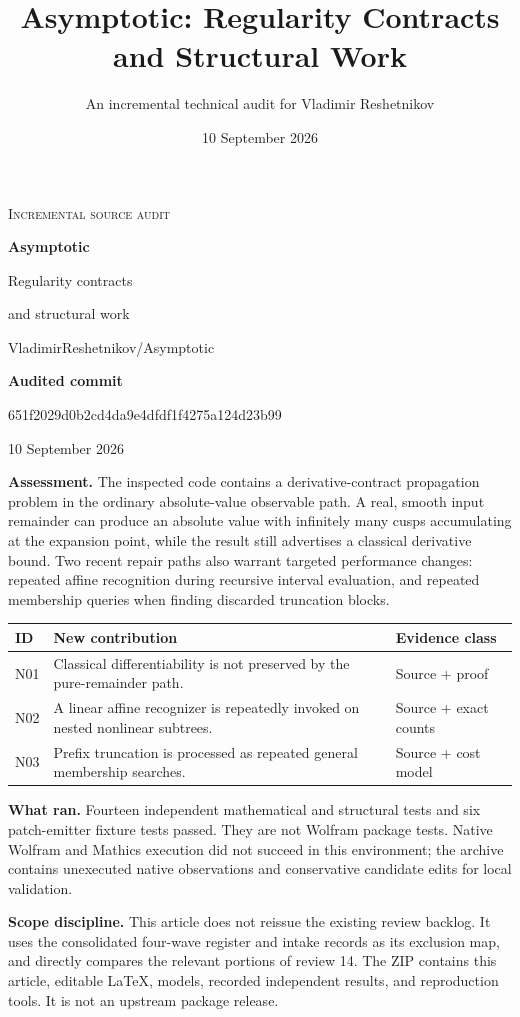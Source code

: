 \documentclass[11pt,a4paper]{article}
\title{Asymptotic: Regularity Contracts and Structural Work}
\author{An incremental technical audit for Vladimir Reshetnikov}
\date{10 September 2026}
\newcommand{\code}[1]{\texttt{\detokenize{#1}}}
\newcommand{\pin}{651f2029d0b2cd4da9e4dfdf1f4275a124d23b99}
\begin{document}
\begin{titlepage}
\vspace*{10mm}
{\Large\scshape Incremental source audit\par}
\vspace{9mm}
{\Huge\bfseries Asymptotic\par}
\vspace{4mm}
{\LARGE Regularity contracts\par and structural work\par}
\vspace{10mm}
{\large VladimirReshetnikov/Asymptotic\par}
\vspace{3mm}
\textbf{Audited commit}\par
{\small\ttfamily\pin\par}
\vspace{3mm}
10 September 2026
\vspace{10mm}

\textbf{Assessment.} The inspected code contains a derivative-contract propagation
problem in the ordinary absolute-value observable path. A real, smooth input
remainder can produce an absolute value with infinitely many cusps accumulating
at the expansion point, while the result still advertises a classical derivative
bound. Two recent repair paths also warrant targeted performance changes: repeated
affine recognition during recursive interval evaluation, and repeated membership
queries when finding discarded truncation blocks.

\begin{tabularx}{\textwidth}{@{}lXl@{}}
\toprule ID & New contribution & Evidence class\\\midrule
N01 & Classical differentiability is not preserved by the pure-remainder \code{Abs} path. & Source + proof\\
N02 & A linear affine recognizer is repeatedly invoked on nested nonlinear subtrees. & Source + exact counts\\
N03 & Prefix truncation is processed as repeated general membership searches. & Source + cost model\\
\bottomrule
\end{tabularx}

\vspace{4mm}
\textbf{What ran.} Fourteen independent mathematical and structural tests and six
patch-emitter fixture tests passed. They are not Wolfram package tests. Native
Wolfram and Mathics execution did not succeed in this environment; the archive
contains unexecuted native observations and conservative candidate edits for
local validation.

\vfill
\textbf{Scope discipline.} This article does not reissue the existing review
backlog. It uses the consolidated four-wave register and intake records as its
exclusion map, and directly compares the relevant portions of review 14. The ZIP
contains this article, editable \LaTeX, models, recorded independent results,
and reproduction tools. It is not an upstream package release.
\end{titlepage}
\end{document}
